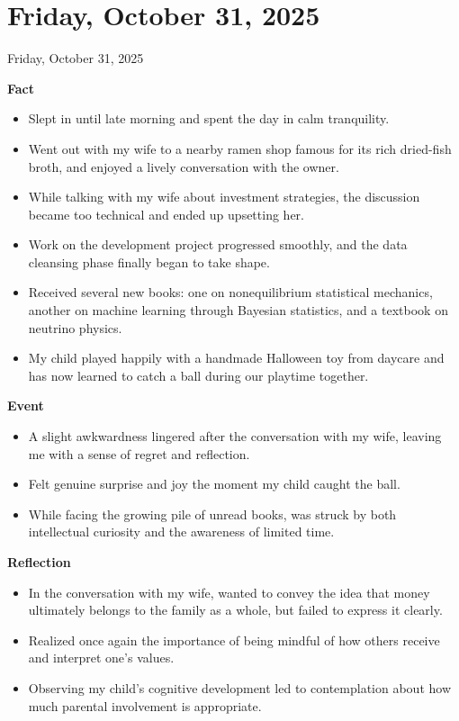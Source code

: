 \documentclass[dvipdfmx, autodetect-engine, aspectratio=169, 10.5pt]{beamer}
\begin{document}
\section{Friday, October 31, 2025}  
\begin{frame}{Friday, October 31, 2025}  
	\tiny  

	\textbf{Fact}  
	\begin{itemize}
		\item Slept in until late morning and spent the day in calm tranquility.  
		\item Went out with my wife to a nearby ramen shop famous for its rich dried-fish broth, and enjoyed a lively conversation with the owner.  
		\item While talking with my wife about investment strategies, the discussion became too technical and ended up upsetting her.  
		\item Work on the development project progressed smoothly, and the data cleansing phase finally began to take shape.  
		\item Received several new books: one on nonequilibrium statistical mechanics, another on machine learning through Bayesian statistics, and a textbook on neutrino physics.  
		\item My child played happily with a handmade Halloween toy from daycare and has now learned to catch a ball during our playtime together.  
	\end{itemize}

	\textbf{Event}  
	\begin{itemize}
		\item A slight awkwardness lingered after the conversation with my wife, leaving me with a sense of regret and reflection.  
		\item Felt genuine surprise and joy the moment my child caught the ball.  
		\item While facing the growing pile of unread books, was struck by both intellectual curiosity and the awareness of limited time.  
	\end{itemize}

	\textbf{Reflection}  
	\begin{itemize}
		\item In the conversation with my wife, wanted to convey the idea that money ultimately belongs to the family as a whole, but failed to express it clearly.  
		\item Realized once again the importance of being mindful of how others receive and interpret one's values.  
		\item Observing my child's cognitive development led to contemplation about how much parental involvement is appropriate.  
	\end{itemize}


\end{frame}
\end{document}
